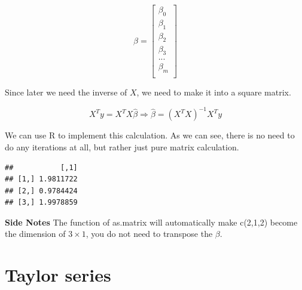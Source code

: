 \documentclass[]{book}
\newenvironment{Shaded}{\begin{snugshade}}{\end{snugshade}}
\newcommand{\CommentTok}[1]{\textcolor[rgb]{0.56,0.35,0.01}{\textit{#1}}}
\newcommand{\DataTypeTok}[1]{\textcolor[rgb]{0.13,0.29,0.53}{#1}}
\newcommand{\DecValTok}[1]{\textcolor[rgb]{0.00,0.00,0.81}{#1}}
\newcommand{\KeywordTok}[1]{\textcolor[rgb]{0.13,0.29,0.53}{\textbf{#1}}}
\newcommand{\NormalTok}[1]{#1}
\newcommand{\OperatorTok}[1]{\textcolor[rgb]{0.81,0.36,0.00}{\textbf{#1}}}
\begin{document}
\[\beta = \begin{bmatrix}\beta_0 \\
\beta_1 \\
\beta_2 \\
\beta_3 \\
...\\
\beta_m \\
\end{bmatrix}\]

Since later we need the inverse of \(X\), we need to make it into a square matrix.

\[X^Ty=X^TX \hat{\beta} \Rightarrow \hat{\beta} = (X^TX)^{-1} X^Ty\]

We can use R to implement this calculation. As we can see, there is no need to do any iterations at all, but rather just pure matrix calculation.

\begin{Shaded}
\end{Shaded}

\begin{verbatim}
##           [,1]
## [1,] 1.9811722
## [2,] 0.9784424
## [3,] 1.9978859
\end{verbatim}

\textbf{Side Notes}
The function of as.matrix will automatically make c(2,1,2) become the dimension of \(3 \times 1\), you do not need to transpose the \(\beta\).

\hypertarget{taylor-series}{%
\section{Taylor series}\label{taylor-series}}
\end{document}

